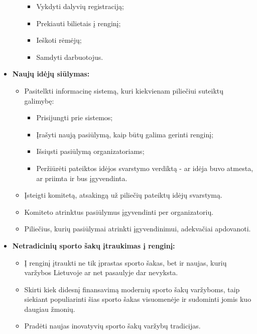 \documentclass{VUMIFPSkursinis}
\begin{document}
\begin{itemize}
\begin{itemize}
              \begin{itemize}
                \item Vykdyti dalyvių registraciją;
                \item Prekiauti bilietais į renginį;
                \item Ieškoti rėmėjų;
                \item Samdyti darbuotojus.
              \end{itemize}
          \end{itemize}
        \item \textbf{Naujų idėjų siūlymas:}
          \begin{itemize}
            \item Pasitelkti informacinę sistemą, kuri kiekvienam piliečiui suteiktų galimybę:
              \begin{itemize}
                \item Prisijungti prie sistemos;
                \item Įrašyti naują pasiūlymą, kaip būtų galima gerinti renginį;
                \item Išsiųsti pasiūlymą organizatoriams;
                \item Peržiūrėti pateiktos idėjos svarstymo verdiktą - ar idėja buvo atmesta, ar priimta ir bus įgyvendinta.
              \end{itemize}
            \item Įsteigti komitetą, atsakingą už piliečių pateiktų idėjų svarstymą.
            \item Komiteto atrinktus pasiūlymus įgyvendinti per organizatorių.
            \item Piliečius, kurių pasiūlymai atrinkti įgyvendinimui, adekvačiai apdovanoti.
          \end{itemize}
        \item \textbf{Netradicinių sporto šakų įtraukimas į renginį:}
          \begin{itemize}
            \item Į renginį įtraukti ne tik įprastas sporto šakas, bet ir naujas, kurių varžybos Lietuvoje ar net pasaulyje dar nevyksta.
            \item Skirti kiek didesnį finansavimą modernių sporto šakų varžyboms, taip siekiant populiarinti šias sporto šakas visuomenėje ir sudominti jomis kuo daugiau žmonių.
            \item Pradėti naujas inovatyvių sporto šakų varžybų tradicijas.
          \end{itemize}
			\end{itemize}
\end{document}
